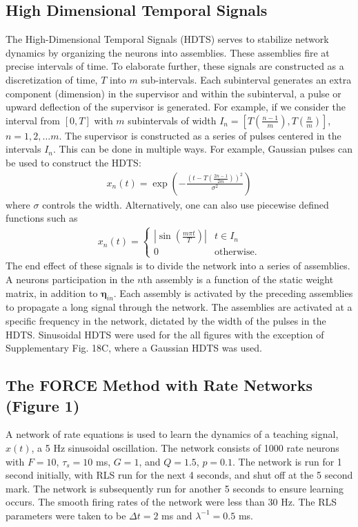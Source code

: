 \documentclass[11pt]{article} %
\begin{document}
\subsection*{High Dimensional Temporal Signals} 

The High-Dimensional Temporal Signals (HDTS) serves to stabilize network dynamics by organizing the neurons into assemblies.  These assemblies fire at precise intervals of time.   To elaborate further, these signals are constructed as a discretization of time, $T$ into $m$ sub-intervals.   Each subinterval generates an extra component (dimension) in the supervisor and within the subinterval, a pulse or upward deflection of the supervisor is generated.  For example, if we consider the interval from $[0,T]$ with $m$ subintervals of width $I_n = [T\left(\frac{n-1}{m}\right),T\left(\frac{n}{m}\right)]$, $n=1,2,\ldots m$.  The supervisor is constructed as a series of pulses centered in the intervals $I_n$.  This can be done in multiple ways.  For example, Gaussian pulses can be used to construct the HDTS:
\begin{eqnarray}
x_n(t) = \exp\left(-\frac{\left(t - T\left(\frac{2n-1}{2m} \right)\right)^2}{\sigma^2} \right)
\end{eqnarray}
where $\sigma$ controls the width.  Alternatively, one can also use piecewise defined functions such as
\begin{eqnarray}
x_n(t) = \begin{cases} |\sin(\frac{m\pi t}{T})| & t\in I_n\\ 0 & \text{otherwise}. \end{cases}
\end{eqnarray}
The end effect of these signals is to divide the network into a series of assemblies.  A neurons participation in the $n$th assembly is a function of the static weight matrix, in addition to $\bm \eta_{in}$.  Each assembly is activated by the preceding assemblies to propagate a long signal through the network.  The assemblies are activated at a specific frequency in the network, dictated by the width of the pulses in the HDTS.  Sinusoidal HDTS were used for the all figures with the exception of Supplementary Fig. 18C, where a Gaussian HDTS was used.    



\subsection*{The FORCE Method with Rate Networks (Figure 1) }
A network of rate equations is used to learn the dynamics of a teaching signal, $x(t)$, a 5 Hz sinusoidal oscillation.  The network consists of 1000 rate neurons with $F = 10$, $\tau_s = 10$ ms, $G=1$, and $Q=1.5$, $p=0.1$.    The network is run for 1 second initially, with RLS run for the next 4 seconds, and shut off at the 5 second mark.  The network is subsequently run for another 5 seconds to ensure learning occurs.   The smooth firing rates of the network were less than 30 Hz.  The RLS parameters were taken to be $\Delta t = 2$ ms and $\lambda^{-1} =  0.5$ ms.  
\end{document}
